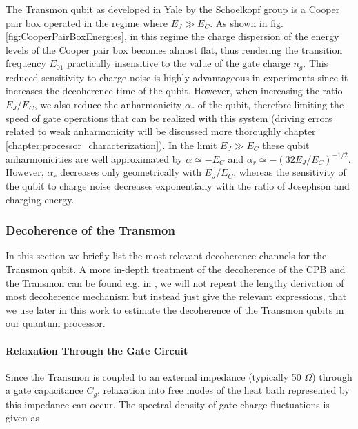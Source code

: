 The Transmon qubit as developed in Yale by the Schoelkopf group \cite{koch_charge-insensitive_2007,wallraff_strong_2004} is a Cooper pair box operated in the regime where $E_J \gg E_C$. As shown in fig. \ref{fig:CooperPairBoxEnergies}, in this regime the charge dispersion of the energy levels of the Cooper pair box becomes almost flat, thus rendering the transition frequency $E_{01}$ practically insensitive to the value of the gate charge $n_g$. This reduced sensitivity to charge noise is highly advantageous in experiments since it increases the decoherence time of the qubit. However, when increasing the ratio $E_J/E_C$, we also reduce the anharmonicity $\alpha_r$ of the qubit, therefore limiting the speed of gate operations that can be realized with this system (driving errors related to weak anharmonicity will be discussed more thoroughly chapter \ref{chapter:processor_characterization}). In the limit $E_J \gg E_C$ these qubit anharmonicities are well approximated by $\alpha \simeq -E_C$ and $\alpha_r \simeq -(32 E_J / E_C)^{-1/2}$. However, $\alpha_r$ decreases only geometrically with $E_J/E_C$, whereas the sensitivity of the qubit to charge noise decreases exponentially with the ratio of Josephson and charging energy.

\subsubsection{Decoherence of the Transmon}

In this section we briefly list the most relevant decoherence channels for the Transmon qubit. A more in-depth treatment of the decoherence of the CPB and the Transmon can be found e.g. in \citep{cottet_implementation_2002,koch_charge-insensitive_2007}, we will not repeat the lengthy derivation of most decoherence mechanism but instead just give the relevant expressions, that we use later in this work to estimate the decoherence of the Transmon qubits in our quantum processor.

\paragraph{Relaxation Through the Gate Circuit}

Since the Transmon is coupled to an external impedance (typically 50 $\Omega$) through a gate capacitance $C_g$, relaxation into free modes of the heat bath represented by this impedance can occur. The spectral density of gate charge fluctuations is given as

